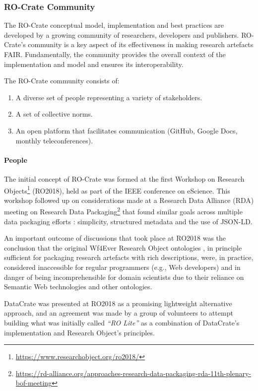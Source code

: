 \subsubsection{RO-Crate Community}\label{ch5:community}

The RO-Crate conceptual model, implementation and best practices are
developed by a growing community of researchers, developers and
publishers. RO-Crate's community is a key aspect of its effectiveness in
making research artefacts FAIR. Fundamentally, the community provides
the overall context of the implementation and model and ensures its
interoperability.

The RO-Crate community consists of:

\begin{enumerate}
\item
  A diverse set of people representing a variety of stakeholders.
\item
  A set of collective norms.
\item
  An open platform that facilitates communication (GitHub, Google Docs,
  monthly teleconferences).
\end{enumerate}

\hypertarget{people}{%
\paragraph{People}\label{ch5:people}}

The initial concept of RO-Crate was formed at the first Workshop on
Research Objects\footnote{\url{https://www.researchobject.org/ro2018/}} (RO2018),
held as part of the IEEE conference on eScience. This workshop followed
up on considerations made at a Research Data Alliance (RDA) meeting on
Research Data
Packaging\footnote{\url{https://rd-alliance.org/approaches-research-data-packaging-rda-11th-plenary-bof-meeting}}
that found similar goals across multiple data packaging efforts
\cite{OCarragain 2019}: simplicity, structured metadata and the
use of JSON-LD.

An important outcome of discussions that took place at RO2018 was the
conclusion that the original Wf4Ever Research Object ontologies
\cite{Belhajjame 2015}, in
principle sufficient for packaging research artefacts with rich
descriptions, were, in practice, considered inaccessible for regular
programmers (e.g., Web developers) and in danger of being
incomprehensible for domain scientists due to their reliance on Semantic
Web technologies and other ontologies.

DataCrate \cite{Sefton 2018} was
presented at RO2018 as a promising lightweight alternative approach, and
an agreement was made by a group of volunteers to attempt building what
was initially called \emph{``RO Lite''} as a combination of DataCrate's
implementation and Research Object's principles.

